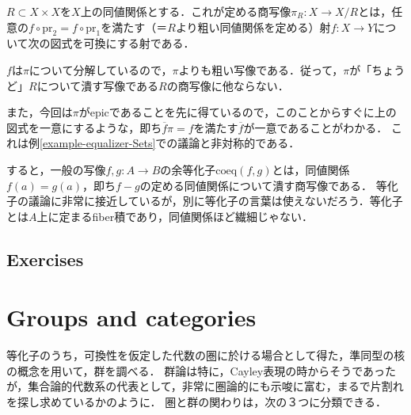 \documentclass[uplatex, dvipdfmx]{jsarticle}
\begin{document}
\begin{example}
    $R\subset X\times X$を$X$上の同値関係とする．これが定める商写像$\pi_R:X\to X/R$とは，任意の$f\circ\mathrm{pr}_2=f\circ\mathrm{pr}_1$を満たす（＝$R$より粗い同値関係を定める）射$f:X\to Y$について次の図式を可換にする射である．
    \begin{center}
    \end{center}
    $f$は$\pi$について分解しているので，$\pi$よりも粗い写像である．従って，$\pi$が「ちょうど」$R$について潰す写像である$R$の商写像に他ならない．

    また，今回は$\pi$がepicであることを先に得ているので，このことからすぐに上の図式を一意にするような，即ち$\overline{f}\pi=f$を満たす$\overline{f}$が一意であることがわかる．
    これは例\ref{example-equalizer-Sets}での議論と非対称的である．
\end{example}
\begin{remark*}
    すると，一般の写像$f,g:A\to B$の余等化子$\mathrm{coeq}(f,g)$とは，同値関係$f(a)=g(a)$，即ち$f-g$の定める同値関係について潰す商写像である．
    等化子の議論に非常に接近しているが，別に等化子の言葉は使えないだろう．等化子とは$A$上に定まるfiber積であり，同値関係ほど繊細じゃない．
\end{remark*}

\begin{example}[Top]
    
\end{example}

\begin{example}
    
\end{example}

\subsection{Exercises}

\section{Groups and categories}
等化子のうち，可換性を仮定した代数の圏に於ける場合として得た，準同型の核の概念を用いて，群を調べる．
群論は特に，Cayley表現の時からそうであったが，集合論的代数系の代表として，非常に圏論的にも示唆に富む，まるで片割れを探し求めているかのように．
圏と群の関わりは，次の３つに分類できる．
\end{document}
